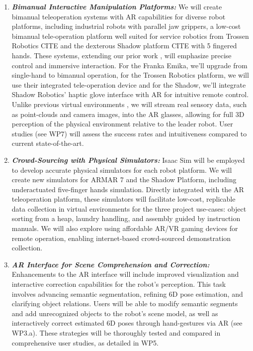 \documentclass{erc-B2}
\begin{document}
\begin{enumerate}
\item \textit{\textbf{Bimanual Interactive Manipulation Platforms:}} We will create bimanual teleoperation systems with AR capabilities for diverse robot platforms, including industrial robots with parallel jaw grippers, a low-cost bimanual tele-operation platform well suited for service robotics from Trossen Robotics CITE and the dexterous Shadow platform CITE with 5 fingered hands. These systems, extending our prior work \cite{CITE}, will emphasize precise control and immersive interaction. For the Franka Emika, we'll upgrade from single-hand to bimanual operation, for the Trossen Robotics platform, we will use their integrated tele-operation device and for the Shadow, we'll integrate Shadow Robotics' haptic glove interface with AR for intuitive remote control. Unlike previous virtual environments \cite{CITE}, we will stream real sensory data, such as point-clouds and camera images, into the AR glasses, allowing for full 3D perception of the physical environment relative to the leader robot. User studies (see WP7) will assess the success rates and intuitiveness compared to current state-of-the-art.
\item \textit{\textbf{Crowd-Sourcing with Physical Simulators:}} Isaac Sim \cite{mittal2023orbit} will be employed to develop accurate physical simulators for each robot platform. We will create new simulators for ARMAR 7 and the Shadow Platform, including underactuated five-finger hands simulation. Directly integrated with the AR teleoperation platform, these simulators will facilitate low-cost, replicable data collection in virtual environments for the three project use-cases: object sorting from a heap, laundry handling, and assembly guided by instruction manuals. We will also explore using affordable AR/VR gaming devices for remote operation, enabling internet-based crowd-sourced demonstration collection.
\item \textit{\textbf{AR Interface for Scene Comprehension and Correction:}} Enhancements to the AR interface will include improved visualization and interactive correction capabilities for the robot's perception. This task involves advancing semantic segmentation, refining 6D pose estimation, and clarifying object relations. Users will be able to modify semantic segments and add unrecognized objects to the robot's scene model, as well as interactively correct estimated 6D poses through hand-gestures via AR (see WP3.a). These strategies will be thoroughly tested and compared in comprehensive user studies, as detailed in WP5.

\end{enumerate}
\end{document}
